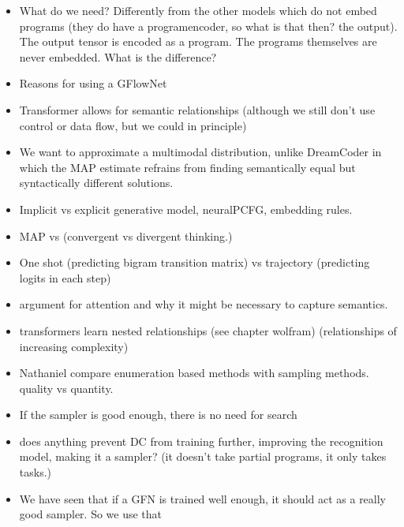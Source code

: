 \begin{itemize}
    \item What do we need? Differently from the other models which do not embed programs (they do have a programencoder, so what is that then? the output). The output tensor is encoded as a program. The programs themselves are never embedded. What is the difference?
    \item Reasons for using a GFlowNet 
    \item Transformer allows for semantic relationships (although we still don't use control or data flow, but we could in principle)
    \item We want to approximate a multimodal distribution, unlike DreamCoder in which the MAP estimate refrains from finding semantically equal but syntactically different solutions.
    \item Implicit vs explicit generative model, neuralPCFG, embedding rules. 
    \item MAP vs  (convergent vs divergent thinking.)
    \item One shot (predicting bigram transition matrix) vs trajectory (predicting logits in each step)
    \item argument for attention and why it might be necessary to capture semantics.
    \item transformers learn nested relationships (see chapter wolfram) (relationships of increasing complexity)
\end{itemize}
    








\begin{itemize}
    \item Nathaniel compare enumeration based methods with sampling methods. quality vs quantity.
    \item If the sampler is good enough, there is no need for search
    \item does anything prevent DC from training further, improving the recognition model, making it a sampler? (it doesn't take partial programs, it only takes tasks.)
    \item We have seen that if a GFN is trained well enough, it should act as a really good sampler. So we use that 
\end{itemize}


